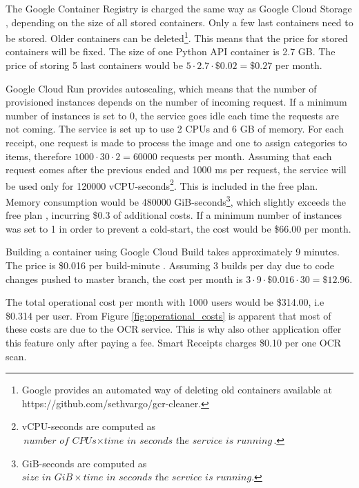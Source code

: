 \documentclass[
  digital, %
  table,   %
  oneside, %
  lof,     %
  lot,     %
]{fithesis3}
\begin{document}
The Google Container Registry is charged the same way as Google Cloud Storage \cite{ContainerRegistryPricing}, depending on the size of all stored containers. Only a few last containers need to be stored. Older containers can be deleted\footnote{Google provides an automated way of deleting old containers available at https://github.com/sethvargo/gcr-cleaner.}. This means that the price for stored containers will be fixed. The size of one Python API container is 2.7 GB. The price of storing 5 last containers would be $5\cdot2.7\cdot\$0.02 = \$0.27$ per month. 

Google Cloud Run provides autoscaling, which means that the number of provisioned instances depends on the number of incoming request. If a minimum number of instances is set to 0, the service goes idle each time the requests are not coming. The service is set up to use 2 CPUs and 6 GB of memory. For each receipt, one request is made to process the image and one to assign categories to items, therefore $\num{1000}\cdot30\cdot2 = \num{60000}$ requests per month. Assuming that each request comes after the previous ended and \num{1000} ms per request, the service will be used only for \num{120000} vCPU-seconds\footnote{vCPU-seconds are computed as $\textit{number of CPUs} \times \textit{time in seconds the service is running}$.}. This is included in the free plan. Memory consumption would be \num{480000} GiB-seconds\footnote{GiB-seconds are computed as $\textit{size in GiB} \times \textit{time in seconds the service is running}.$}, which slightly exceeds the free plan \cite{CloudRunPricing}, incurring \$0.3 of additional costs. 
If a minimum number of instances was set to 1 in order to prevent a cold-start, the cost would be \$66.00 per month.

Building a container using Google Cloud Build takes approximately 9 minutes. The price is \$0.016 per build-minute \cite{CloudBuildPricing}. Assuming 3 builds per day due to code changes pushed to master branch, the cost per month is $3\cdot9\cdot\$0.016\cdot30 = \$12.96$.

The total operational cost per month with \num{1000} users would be \$314.00, i.e \$0.314 per user.
From Figure \ref{fig:operational_costs} is apparent that most of these costs are due to the OCR service. This is why also other application offer this feature only after paying a fee. Smart Receipts charges \$0.10 per one OCR scan.
\end{document}
